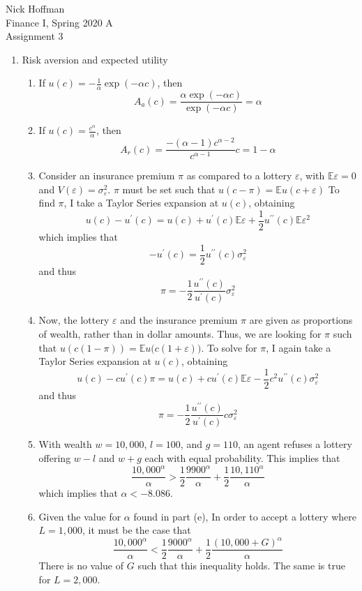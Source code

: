 \documentclass[11pt]{article}
\newcommand{\ev}{\mathbb{E}}
\begin{document}
\begin{flushleft}
	Nick Hoffman \\
	Finance I, Spring 2020 A \\
	Assignment 3 \\
\end{flushleft}

\begin{enumerate}
	\item Risk aversion and expected utility
	\begin{enumerate} 
		\item If \(u(c) = -\frac{1}{\alpha} \exp(-\alpha c)\), then
		\[A_a(c) = \frac{\alpha \exp(-\alpha c)}{\exp(-\alpha c)} = \alpha\]
		\item If \(u(c) = \frac{c^\alpha }{\alpha}\), then
		\[A_r(c) = \frac{-(\alpha - 1)c^{\alpha - 2}}{c^{\alpha - 1}}c = 1 - \alpha\]
		\item Consider an insurance premium \(\pi\) as compared to a lottery \(\varepsilon\), with \(\ev{\varepsilon} = 0\) and \(V(\varepsilon) = \sigma^2_\varepsilon\). \(\pi\) must be set such that \(u(c - \pi) = \ev{u(c + \varepsilon)}\) To find \(\pi\), I take a Taylor Series expansion at \(u(c)\), obtaining
		\[u(c) - u^\prime(c) = u(c) + u^\prime(c)\ev{\varepsilon} + \frac{1}{2}u^{\prime\prime}(c)\ev{\varepsilon^2}\]
		which implies that
		\[-u^\prime(c) = \frac{1}{2}u^{\prime\prime}(c)\sigma^2_\varepsilon\]
		and thus
		\[\pi = -\frac{1}{2}\frac{u^{\prime\prime}(c)}{u^{\prime}(c)}\sigma_\varepsilon^2\]
		\item Now, the lottery \(\varepsilon\) and the insurance premium \(\pi\) are given as proportions of wealth, rather than in dollar amounts. Thus, we are looking for \(\pi\) such that \(u(c(1 - \pi)) = \ev{u\big(c(1 + \varepsilon)\big)}\). To solve for \(\pi\), I again take a Taylor Series expansion at \(u(c)\), obtaining
		\[u(c) - c u^\prime (c)\pi = u(c) + c u^\prime (c)\ev{\varepsilon} -\frac{1}{2}c^2 u^{\prime\prime} (c)\sigma_\varepsilon^2\]
		and thus
		\[\pi = -\frac{1}{2}\frac{u^{\prime\prime}(c)}{u^{\prime}(c)} c \sigma_\varepsilon^2\]
		\item With wealth \(w = 10,000\), \(l = 100\), and \(g = 110\), an agent refuses a lottery offering \(w - l\) and \(w + g\) each with equal probability. This implies that
		\[\frac{10,000^\alpha}{\alpha} > \frac{1}{2}\frac{9900^\alpha}{\alpha} + \frac{1}{2}\frac{10,110^\alpha}{\alpha}\]
		which implies that \(\alpha < -8.086\).
		\item Given the value for \(\alpha\) found in part (e), In order to accept a lottery where \(L = 1,000\), it must be the case that 
		\[\frac{10,000^\alpha}{\alpha} < \frac{1}{2}\frac{9000^\alpha}{\alpha} + \frac{1}{2}\frac{(10,000 + G)^\alpha}{\alpha}\]
		There is no value of \(G\) such that this inequality holds. The same is true for \(L = 2,000\).
	\end{enumerate}


\end{enumerate}
\end{document}
